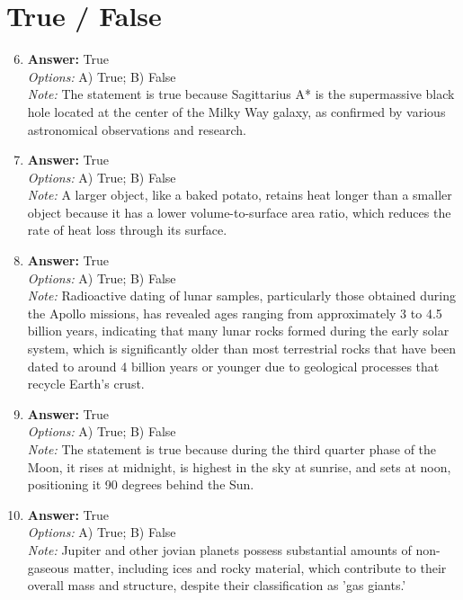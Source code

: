 \documentclass[12pt]{article}
\begin{document}
\section*{True / False}
\begin{enumerate}[label=\arabic*.]
\setcounter{enumi}{5}
\item \textbf{Answer:} True
\\ \textit{Options:} A) True; B) False
\\ \textit{Note:} The statement is true because Sagittarius A* is the supermassive black hole located at the center of the Milky Way galaxy, as confirmed by various astronomical observations and research.
\item \textbf{Answer:} True
\\ \textit{Options:} A) True; B) False
\\ \textit{Note:} A larger object, like a baked potato, retains heat longer than a smaller object because it has a lower volume-to-surface area ratio, which reduces the rate of heat loss through its surface.
\item \textbf{Answer:} True
\\ \textit{Options:} A) True; B) False
\\ \textit{Note:} Radioactive dating of lunar samples, particularly those obtained during the Apollo missions, has revealed ages ranging from approximately 3 to 4.5 billion years, indicating that many lunar rocks formed during the early solar system, which is significantly older than most terrestrial rocks that have been dated to around 4 billion years or younger due to geological processes that recycle Earth's crust.
\item \textbf{Answer:} True
\\ \textit{Options:} A) True; B) False
\\ \textit{Note:} The statement is true because during the third quarter phase of the Moon, it rises at midnight, is highest in the sky at sunrise, and sets at noon, positioning it 90 degrees behind the Sun.
\item \textbf{Answer:} True
\\ \textit{Options:} A) True; B) False
\\ \textit{Note:} Jupiter and other jovian planets possess substantial amounts of non-gaseous matter, including ices and rocky material, which contribute to their overall mass and structure, despite their classification as 'gas giants.'
\end{enumerate}
\end{document}
